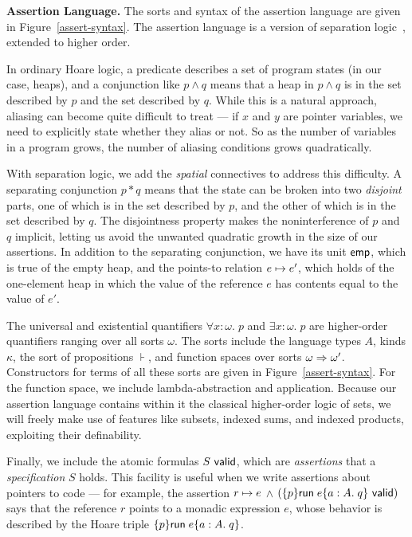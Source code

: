 \documentclass[preprint,natbib]{sigplanconf}
\begin{document}
\textbf{Assertion Language.} The sorts and syntax of the assertion
language are given in Figure~\ref{assert-syntax}. The assertion
language is a version of separation logic~\cite{sep-logic}, extended
to higher order.

In ordinary Hoare logic, a predicate describes a set of program states
(in our case, heaps), and a conjunction like $p \land q$ means that a
heap in $p \land q$ is in the set described by $p$ and the set described
by $q$. While this is a natural approach, aliasing can become quite
difficult to treat --- if $x$ and $y$ are pointer variables, we need
to explicitly state whether they alias or not. So as the number of
variables in a program grows, the number of aliasing conditions grows
quadratically.

With separation logic, we add the \emph{spatial} connectives to
address this difficulty. A separating conjunction $p * q$ means that
the state can be broken into two \emph{disjoint} parts, one of which
is in the set described by $p$, and the other of which is in the
set described by $q$. The disjointness property makes the
noninterference of $p$ and $q$ implicit, letting us avoid the unwanted
quadratic growth in the size of our assertions. In addition to the
separating conjunction, we have its unit $\mathsf{emp}$, which is true of the
empty heap, and the points-to relation $e \mapsto e'$, which holds
of the one-element heap in which the value of the reference $e$ has 
contents equal to the value of $e'$. 

The universal and existential quantifiers $\forall x:\omega.\;p$ and
$\exists x:\omega.\;p$ are higher-order quantifiers ranging over all
sorts $\omega$. The sorts include the language types $A$, kinds $\kappa$, the sort of
propositions $\assert$, and function spaces over sorts $\omega \Rightarrow
\omega'$. Constructors for terms of all these sorts are
given in Figure~\ref{assert-syntax}. For the function space, we
include lambda-abstraction and application. Because our assertion
language contains within it the classical higher-order logic of sets,
we will freely make use of features like subsets, indexed sums, and
indexed products, exploiting their definability.

Finally, we include the atomic formulas ${S}\mbox{\textsf{{ valid}}}$, which are
\emph{assertions} that a \emph{specification} $S$ holds. This facility
is useful when we write assertions about pointers to code --- for
example, the assertion $r \mapsto e$ $\land$
$({\{{p}\}{\mbox{\textsf{{run}}}\;{e}}\{{a:A}.\;{q}\}}\mbox{\textsf{{ valid}}})$ says that the reference $r$ points
to a monadic expression $e$, whose behavior is described by the Hoare
triple $\{{p}\}{\mbox{\textsf{{run}}}\;{e}}\{{a:A}.\;{q}\}$.
\end{document}
